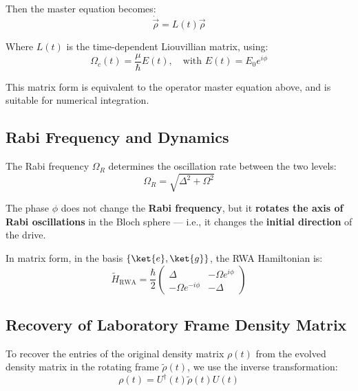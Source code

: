 Then the master equation becomes:
\begin{equation}
	\dot{\vec{\rho}} = L(t) \vec{\rho}
	\label{eq:LiouvillianMatrixForm}
\end{equation}

Where \(L(t)\) is the time-dependent Liouvillian matrix, using:
\begin{equation}
	\Omega_c(t) = \frac{\mu}{\hbar} E(t), \quad \text{with } E(t) = E_0 e^{i\phi}
	\label{eq:TimeDepRabiFreq}
\end{equation}

This matrix form is equivalent to the operator master equation above, and is suitable for numerical integration.

\subsection{Rabi Frequency and Dynamics}

The Rabi frequency \(\Omega_R\) determines the oscillation rate between the two levels:
\begin{equation}
	\Omega_R = \sqrt{\Delta^2 + \Omega^2}
	\label{eq:RabiFrequency}
\end{equation}

The phase \(\phi\) does not change the \textbf{Rabi frequency}, but it \textbf{rotates the axis of Rabi oscillations} in the Bloch sphere — i.e., it changes the \textbf{initial direction} of the drive.

In matrix form, in the basis \(\{ \ket{e}, \ket{g} \}\), the RWA Hamiltonian is:
\begin{equation}
	\tilde{H}_{\text{RWA}} = \frac{\hbar}{2}
	\begin{pmatrix}
		\Delta             & -\Omega e^{i\phi} \\
		-\Omega e^{-i\phi} & -\Delta
	\end{pmatrix}
	\label{eq:RWAHamiltonianMatrix}
\end{equation}

\subsection{Recovery of Laboratory Frame Density Matrix}

To recover the entries of the original density matrix \(\rho(t)\) from the evolved density matrix in the rotating frame \(\tilde{\rho}(t)\), we use the inverse transformation:
\begin{equation}
	\rho(t) = U^\dagger(t) \tilde{\rho}(t) U(t)
	\label{eq:RecoverOriginalDensityMatrix}
\end{equation}

